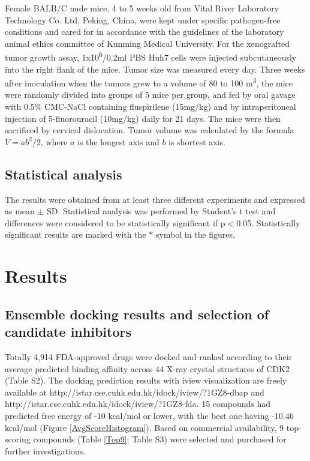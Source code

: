 \documentclass[10pt]{article}
\begin{document}
Female BALB/C nude mice, 4 to 5 weeks old from Vital River Laboratory Technology Co. Ltd, Peking, China, were kept under specific pathogen-free conditions and cared for in accordance with the guidelines of the laboratory animal ethics committee of Kunming Medical University. For the xenografted tumor growth assay, 1x10\textsuperscript{6}/0.2ml PBS Huh7 cells were injected subcutaneously into the right flank of the mice. Tumor size was measured every day. Three weeks after inoculation when the tumors grew to a volume of 80 to 100 m\textsuperscript{3}, the mice were randomly divided into groups of 5 mice per group, and fed by oral gavage with 0.5\% CMC-NaCl containing fluspirilene (15mg/kg) and by intraperitoneal injection of 5-fluorouracil (10mg/kg) daily for 21 days. The mice were then sacrificed by cervical dislocation. Tumor volume was calculated by the formula $V=ab^2/2$, where $a$ is the longest axis and $b$ is shortest axis.

\subsection*{Statistical analysis}

The results were obtained from at least three different experiments and expressed as mean $\pm$ SD. Statistical analysis was performed by Student's t test and differences were considered to be statistically significant if p$<$0.05. Statistically significant results are marked with the $\ast$ symbol in the figures.

\section*{Results}

\subsection*{Ensemble docking results and selection of candidate inhibitors}

Totally 4,914 FDA-approved drugs were docked and ranked according to their average predicted binding affinity across 44 X-ray crystal structures of CDK2 (Table S2). The docking prediction results with iview visualization \cite{1366} are freely available at http://istar.cse.cuhk.edu.hk/idock/iview/?1GZ8-dbap and http://istar.cse.cuhk.edu.hk/idock/iview/?1GZ8-fda. 15 compounds had predicted free energy of -10 kcal/mol or lower, with the best one having -10.46 kcal/mol (Figure \ref{AvgScoreHistogram}). Based on commercial availability, 9 top-scoring compounds (Table \ref{Top9}; Table S3) were selected and purchased for further investigations.
\end{document}
